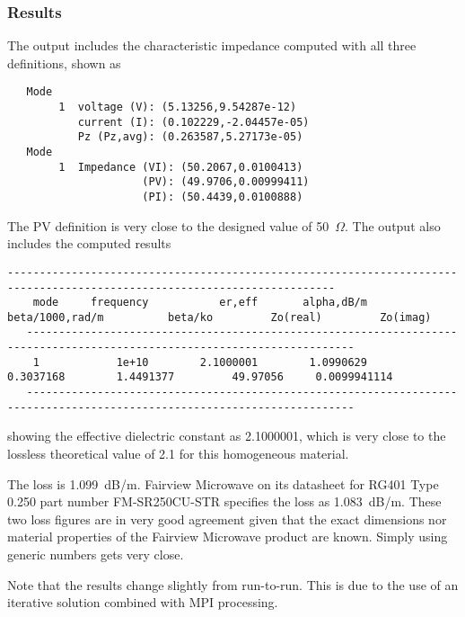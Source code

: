 \documentclass[titlepage]{article}
\renewcommand\_{\textunderscore\linebreak[1]}
\begin{document}
\subsubsection{Results}

The output includes the characteristic impedance computed with all three definitions, shown as
\begin{Verbatim}
   Mode
        1  voltage (V): (5.13256,9.54287e-12)
           current (I): (0.102229,-2.04457e-05)
           Pz (Pz,avg): (0.263587,5.27173e-05)
   Mode
        1  Impedance (VI): (50.2067,0.0100413)
                     (PV): (49.9706,0.00999411)
                     (PI): (50.4439,0.0100888)
\end{Verbatim}
The PV definition is very close to the designed value of 50~$\Omega$. The output also includes the computed results
\begin{Verbatim}[fontsize=\scriptsize]
   -------------------------------------------------------------------------------------------------------------------------
    mode     frequency           er,eff       alpha,dB/m  beta/1000,rad/m          beta/ko         Zo(real)         Zo(imag)
   -------------------------------------------------------------------------------------------------------------------------
    1            1e+10        2.1000001        1.0990629        0.3037168        1.4491377         49.97056     0.0099941114
   -------------------------------------------------------------------------------------------------------------------------
\end{Verbatim}
\noindent showing the effective dielectric constant as 2.1000001, which is very close to the lossless theoretical value of 2.1 for this homogeneous material.

The loss is 1.099~dB/m. Fairview Microwave on its datasheet for RG401 Type 0.250 part number FM-SR250CU-STR specifies the loss as 1.083~dB/m.  These two loss figures are in very good agreement given that the exact dimensions nor material properties of the Fairview Microwave product are known.  Simply using generic numbers gets very close.

Note that the results change slightly from run-to-run.  This is due to the use of an iterative solution combined with MPI processing.
\end{document}
